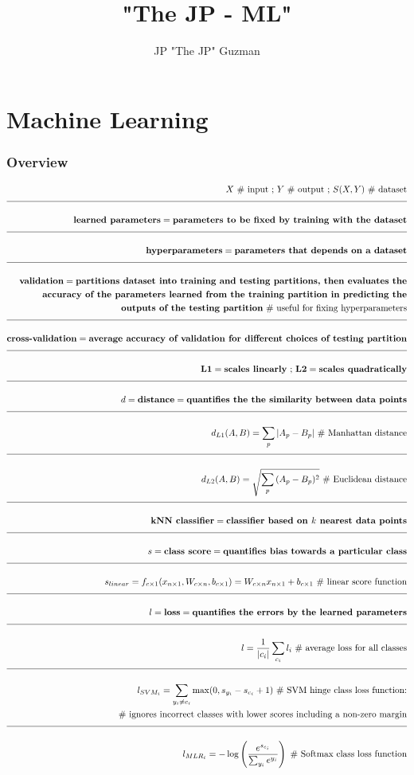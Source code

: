 \documentclass[a4paper]{article}
\title{"The JP - ML"}
\author{JP "The JP" Guzman}
\newcommand{\eqComment}[1]{\text{  \# #1}}
\newcommand{\eqSep}{\text{ ;  }}
\newcommand{\n}{\\[1.5ex] \hline \nonumber \\[0ex]}
\newcommand{\m}{\nonumber \\}
\begin{document}
\maketitle
\allowdisplaybreaks

\section{Machine Learning}
\subsubsection{Overview} %
\begin{tcolorbox}
\begin{align}
   X \eqComment{input} \eqSep Y \eqComment{output} \eqSep S(X, Y) \eqComment{dataset}
\n \textbf{learned parameters} = \textbf{parameters to be fixed by training with the dataset}
\n \textbf{hyperparameters} = \textbf{parameters that depends on a dataset}
\n \textbf{validation} = \textbf{partitions dataset into training and testing partitions, then evaluates the}
\m \textbf{accuracy of the parameters learned from the training partition in predicting the}
\m \textbf{outputs of the testing partition} \eqComment{useful for fixing hyperparameters}
\n \textbf{cross-validation} = \textbf{average accuracy of validation for different choices of testing partition}
\n \textbf{L1} = \textbf{scales linearly} \eqSep \textbf{L2} = \textbf{scales quadratically}
\n d = \textbf{distance} = \textbf{quantifies the the similarity between data points}
\n d_{L1}(A, B) = \sum_p{|A_p - B_p|} \eqComment{Manhattan distance}
\n d_{L2}(A, B) = \sqrt{\sum_p{(A_p - B_p)^2}} \eqComment{Euclidean distance}
\n \textbf{kNN classifier} = \textbf{classifier based on $k$ nearest data points} 
\n s = \textbf{class score} = \textbf{quantifies bias towards a particular class}
\n s_{linear} = f_{c \times 1}(x_{n \times 1}, W_{c \times n}, b_{c \times 1}) = W_{c \times n} x_{n \times 1} + b_{c \times 1} \eqComment{linear score function}
\n l = \textbf{loss} = \textbf{quantifies the errors by the learned parameters}
\n l = \frac{1}{|c_i|} \sum_{c_i} l_i \eqComment{average loss for all classes}
\n l_{SVM_i} =  \sum_{y_i \neq c_i} \max(0, s_{y_i} - s_{c_i} + 1) \eqComment{SVM hinge class loss function:}
\m \eqComment{ignores incorrect classes with lower scores including a non-zero margin}
\n l_{MLR_i} = -\log\left(\frac{e^{s_{c_i}}}{\sum_{y_i} e^{y_i}}\right) \eqComment{Softmax class loss function}

\end{align}
\end{tcolorbox}
\end{document}
